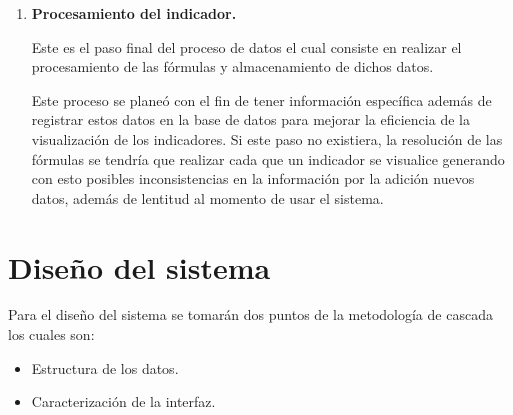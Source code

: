 \begin{enumerate}[1.]
						\textbf{F\'ormulas definidas en el sistema:} Esta funcionalidad permite realizar acciones generales basadas en funciones parametrizables, las cuales se podr\'an acceder con la siguiente nomenclatura NOMBRE\_FUNCION (PARAMETRO\_1, PARAMETRO\_2 ... PARAMETRO\_N).

						Con esto la primera capa de resoluci\'on de f\'ormulas nos permite obtener datos procesados en f\'ormulas que se pueden programar en c\'odigo, ampliando la potencia de la resoluci\'on delas mismas.

						\textbf{F\'ormulas de Microsoft Excel:} Esta funcionalidad es el segundo y \'ultimo de los niveles de resoluci\'on de f\'ormulas del sistema de indicadores, ya que al tener los datos obtenidos mediante la resoluci\'on de f\'ormulas de sistema, podemos realizar la resoluci\'on de f\'ormulas de Excel, permitiendo usar la potencia del motor de f\'ormulas de dicho software, y al tener esta posibilidad se pueden obtener los resultados como si estuvi\'eramos en el mismo software.

					\item \textbf{Procesamiento del indicador.}

						Este es el paso final del proceso de datos el cual consiste en realizar el procesamiento de las f\'ormulas y almacenamiento de dichos datos.

						Este proceso se plane\'o con el fin de tener informaci\'on espec\'ifica adem\'as de registrar estos datos en la base de datos para mejorar la eficiencia de la visualizaci\'on de los indicadores. Si este paso no existiera, la resoluci\'on de las f\'ormulas se tendr\'ia que realizar cada que un indicador se visualice generando con esto posibles inconsistencias en la informaci\'on por la adici\'on  nuevos datos, adem\'as de lentitud al momento de usar el sistema.

		    	\end{enumerate}

	\section{Dise\~no del sistema}
		Para el dise\~no del sistema se tomar\'an dos puntos de la metodolog\'ia de cascada los cuales son:
		\begin{itemize}
			\item Estructura de los datos.
			\item Caracterizaci\'on de la interfaz.
		\end{itemize}

